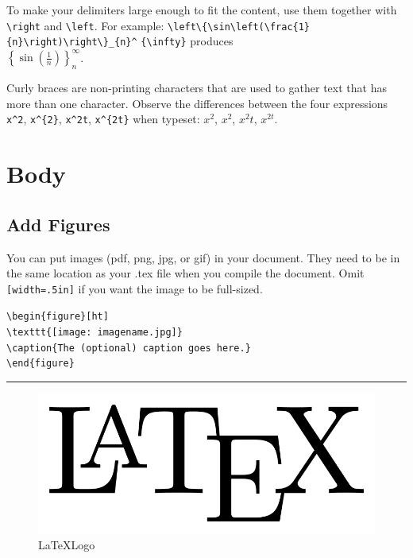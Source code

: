 \documentclass{article} %
\begin{document}
        \vspace{0.5cm}
        \quad To make your delimiters large enough to fit the content, use them together with \verb!\right! and \verb!\left!. For example: \verb!\left\{\sin\left(\frac{1}{n}\right)\right\}_{n}^! \verb!{\infty}! produces\\ $\displaystyle \left\{\sin\left(\frac{1}{n}\right)\right\}_{n}^{\infty}$.
        
        \vspace{0.5cm}
        \quad Curly braces are non-printing characters that are used to gather text that has more than one character. Observe the differences between the four expressions \verb!x^2!, \verb!x^{2}!, \verb!x^2t!, \verb!x^{2t}! when typeset: $x^2$, $x^{2}$, $x^2t$, $x^{2t}$.








  
\newpage
\section{Body}
    \subsection{Add Figures}
    \quad You can put images (pdf, png, jpg, or gif) in your document. They need to be in the same location as your .tex file when you compile the document. Omit   \verb![width=.5in]! if you want the image to be full-sized.
        
        \begin{center}
        \verb!\begin{figure}[ht]! \\
        \verb!\texttt{[image: imagename.jpg]}! \\
        \verb!\caption{The (optional) caption goes here.}! \\
        \verb!\end{figure}!            
        \end{center}

\noindent\rule{16cm}{0.4pt}

        \begin{figure}[H]
            \centering %
            \includegraphics[scale=0.4]{latex.png} %
            \caption{\LaTeX Logo}
            \label{fig:\LaTeX}
        \end{figure}
    
\end{document}
